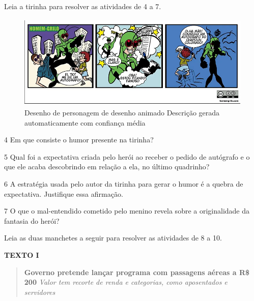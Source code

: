 Leia a tirinha para resolver as atividades de 4 a 7.

\begin{figure}
\centering
\includegraphics[width=5.40625in,height=1.77973in]{./imgSAEB_8_POR/media/image8.png}
\caption{Desenho de personagem de desenho animado Descrição gerada
automaticamente com confiança média}
\end{figure}

\num{4} Em que consiste o humor presente na tirinha?


\num{5} Qual foi a expectativa criada pelo herói ao receber o pedido de
autógrafo e o que ele acaba descobrindo em relação a ela, no último
quadrinho?


\num{6} A estratégia usada pelo autor da tirinha para gerar o humor é a
quebra de expectativa. Justifique essa afirmação.


\num{7} O que o mal-entendido cometido pelo menino revela sobre a
originalidade da fantasia do herói?


Leia as duas manchetes a seguir para resolver as atividades de 8 a 10.

\textbf{TEXTO I}

\begin{quote}
\textbf{Governo pretende lançar programa com passagens aéreas a R\$ 200}
\emph{Valor tem recorte de renda e categorias, como aposentados e
servidores}
\end{quote}

